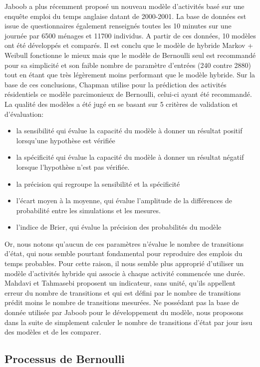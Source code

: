Jaboob \cite{Jaboob-16} a plus récemment proposé un nouveau modèle d'activités basé sur une enquête emploi du temps anglaise datant de 2000-2001. La base de données est issue de questionnaires également renseignés toutes les 10 minutes sur une journée par 6500 ménages et 11700 individus. A partir de ces données, 10 modèles ont été développés et comparés. Il est conclu que le modèle de hybride Markov + Weibull fonctionne le mieux mais que le modèle de Bernoulli seul est recommandé pour sa simplicité et son faible nombre de paramètre d'entrées (240 contre 2880) tout en étant que très légèrement moins performant que le modèle hybride. Sur la base de ces conclusions, Chapman \cite{Chapman-16} utilise pour la prédiction des activités résidentiels ce modèle parcimonieux de Bernoulli, celui-ci ayant été recommandé. La qualité des modèles a été jugé en se basant sur 5 critères de validation et d'évaluation: 
\begin{itemize}
\item la sensibilité qui évalue la capacité du modèle à donner un résultat positif lorsqu'une hypothèse est vérifiée
\item la spécificité qui évalue la capacité du modèle à donner un résultat négatif lorsque l'hypothèse n'est pas vérifiée.
\item la précision qui regroupe la sensibilité et la spécificité
\item l'écart moyen à la moyenne, qui évalue l'amplitude de la différences de probabilité entre les simulations et les mesures.
\item l'indice de Brier, qui évalue la précision des probabilités du modèle
\end{itemize}

Or, nous notons qu'aucun de ces paramètres n'évalue le nombre de transitions d'état, qui nous semble pourtant fondamental pour reproduire des emplois du temps probables. Pour cette raison, il nous semble plus approprié d'utiliser un modèle d'activités hybride qui associe à chaque activité commencée une durée. Mahdavi et Tahmasebi \cite{Mahdavi-14} proposent un indicateur, sans unité, qu'ils appellent erreur du nombre de transitions et qui est défini par le nombre de transitions prédit moins le nombre de transitions mesurées. Ne possédant pas la base de donnée utilisée par Jaboob pour le développement du modèle, nous proposons dans la suite de simplement calculer le nombre de transitions d'état par jour issu des modèles et de les comparer.

\subsection{Processus de Bernoulli}

